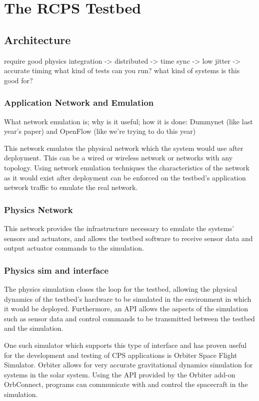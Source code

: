 \section{The RCPS Testbed}

\subsection{Architecture}
require good physics integration -> distributed -> time sync -> low jitter -> accurate timing
what kind of tests can you run?
what kind of systems is this good for?
\subsubsection{Application Network and Emulation}
What network emulation is; why is it useful; how it is done: Dummynet (like last year's paper) and OpenFlow (like we're trying to do this year)

This network emulates the physical network which the system would use after deployment.  This can be a wired or wireless network or networks with any topology.  Using network emulation techniques the characteristics of the network as it would exist after deployment can be enforced on the testbed's application network traffic to emulate the real network.
\subsubsection{Physics Network}
This network provides the infrastructure necessary to emulate the systems' sensors and actuators, and allows the testbed software to receive sensor data and output actuator commands to the simulation.
\subsubsection{Physics sim and interface}
The physics simulation closes the loop for the testbed, allowing the physical dynamics of the testbed's hardware to be simulated in the environment in which it would be deployed.  Furthermore, an API allows the aspects of the simulation such as sensor data and control commands to be transmitted between the testbed and the simulation.

One such simulator which supports this type of interface and has proven useful for the development and testing of CPS applications is Orbiter Space Flight Simulator.  Orbiter allows for very accurate gravitational dynamics simulation for systems in the solar system.  Using the API provided by the Orbiter add-on OrbConnect, programs can communicate with and control the spacecraft in the simulation.  

